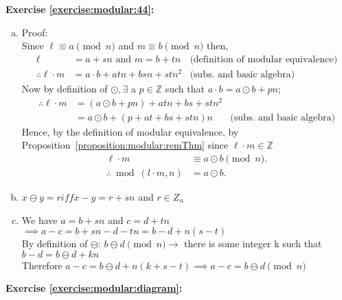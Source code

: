 
\noindent\textbf{Exercise \ref{exercise:modular:44}:} %
\begin{enumerate}[(a)]
\item
Proof:\\
Since $\ell \equiv a\pmod{n}$ and $m \equiv b\pmod{n}$ then,
\begin{align*}
\ell &= a + sn \text{\ and\ } m = b + tn &\text{(definition of modular equivalence)}\\ 
\therefore \ell \cdot m &= a \cdot b + atn + bsn +stn^{2} &\text{(subs. and basic algebra)}
\end{align*}
Now by definition of $\odot, \exists$ a $p\in {\mathbb{Z}}$ such that $a\cdot b = a\odot b + pn$; 
\begin{align*}
\therefore \ell \cdot m &= (a\odot b + pn) + atn + bs + stn^{2}& \\
&= a\odot b  + (p + at + bs + stn)n &\text{(subs. and basic algebra)}
\end{align*}
Hence, by the definition of modular equivalence, by Proposition~\ref{proposition:modular:remThm} since $\ell \cdot m \in {\mathbb{Z}}$\\
\begin{align*} 
\ell \cdot m &\equiv a \odot b\pmod{n}.\\
\therefore \bmod(l\cdot m, n) &= a\odot b.
\end{align*}

\item
$x \ominus y=r iff x-y=r+sn$ and $r \in Z_n$

\item
We have $a=b+sn$ and $c=d+tn$\\
$\implies a-c=b+sn-d-tn=b-d+n(s-t)$\\
By definition of $\ominus$: $b \ominus d \pmod{n} \to$ there is some integer k such that $b-d=b \ominus d +kn$\\
Therefore $a-c=b \ominus d +n(k+s-t) \implies a-c=b \ominus d \pmod{n}$
\end{enumerate}

\noindent\textbf{Exercise \ref{exercise:modular:diagram}:} 

